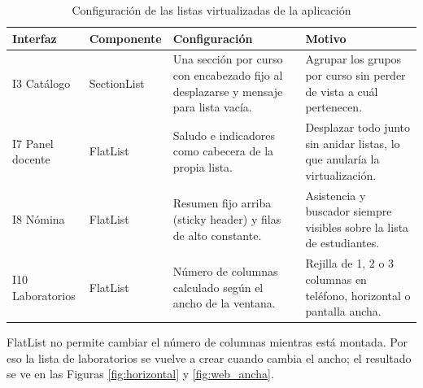 \begin{table}[H]
\centering\small
\caption{Configuración de las listas virtualizadas de la aplicación}\label{tab:listas}
\renewcommand{\arraystretch}{1.25}
\begin{tabular}{|>{\raggedright\arraybackslash}p{}|>{\raggedright\arraybackslash}p{}|>{\raggedright\arraybackslash}p{}|>{\raggedright\arraybackslash}p{}|}
\hline
\rowcolor{colabpyblue} \color{white}\textbf{Interfaz} & \color{white}\textbf{Componente} & \color{white}\textbf{Configuración} & \color{white}\textbf{Motivo} \\ \hline
I3 Catálogo & SectionList & Una sección por curso con encabezado fijo al desplazarse y mensaje para lista vacía. & Agrupar los grupos por curso sin perder de vista a cuál pertenecen. \\ \hline
\rowcolor{colabpybg} I7 Panel docente & FlatList & Saludo e indicadores como cabecera de la propia lista. & Desplazar todo junto sin anidar listas, lo que anularía la virtualización. \\ \hline
I8 Nómina & FlatList & Resumen fijo arriba (sticky header) y filas de alto constante. & Asistencia y buscador siempre visibles sobre la lista de estudiantes. \\ \hline
\rowcolor{colabpybg} I10 Laboratorios & FlatList & Número de columnas calculado según el ancho de la ventana. & Rejilla de 1, 2 o 3 columnas en teléfono, horizontal o pantalla ancha. \\ \hline
\end{tabular}
\end{table}

\begin{notaInfo}
FlatList no permite cambiar el número de columnas mientras está montada. Por eso la lista de laboratorios se vuelve a crear cuando cambia el ancho; el resultado se ve en las Figuras \ref{fig:horizontal} y \ref{fig:web_ancha}.
\end{notaInfo}

\vspace{0.2cm}

